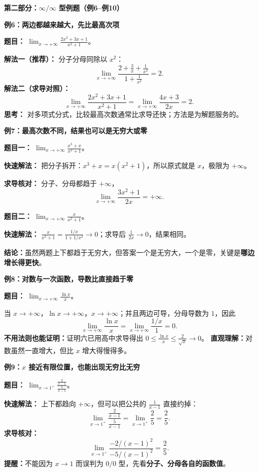 \clearpage
\begin{examplebox}
\textbf{\textcolor{CExample}{第二部分：$\infty/\infty$ 型例题（例6--例10）}}

\textbf{\textcolor{CExample}{例6：两边都越来越大，先比最高次项}}

\textbf{题目：} $\displaystyle\lim_{x\to+\infty}\frac{2x^2+3x+1}{x^2+1}$。

\textbf{解法一（推荐）：} 分子分母同除以 $x^2$：
\[
\lim_{x\to+\infty}\frac{2+\frac3x+\frac1{x^2}}{1+\frac1{x^2}}=\boxed{2}.
\]
\textbf{解法二（求导对照）：}
\[
\lim_{x\to+\infty}\frac{2x^2+3x+1}{x^2+1}
=\lim_{x\to+\infty}\frac{4x+3}{2x}
=2.
\]
\textbf{思考：} 对多项式分式，比较最高次数通常比求导还快；方法是为解题服务的。

\medskip

\medskip
\textbf{\textcolor{CExample}{例7：最高次数不同，结果也可以是无穷大或零}}

\textbf{题目一：} $\displaystyle\lim_{x\to+\infty}\frac{x^3+x}{x^2+1}$。

\textbf{快速解法：} 把分子拆开：$x^3+x=x(x^2+1)$，所以原式就是 $x$，极限为 $+\infty$。

\textbf{求导核对：} 分子、分母都趋于 $+\infty$，
\[
\lim_{x\to+\infty}\frac{3x^2+1}{2x}=+\infty.
\]

\textbf{题目二：} $\displaystyle\lim_{x\to+\infty}\frac{x}{x^2+1}$。

\textbf{快速解法：} $\frac{x}{x^2+1}=\frac{1/x}{1+1/x^2}\to0$；求导后 $\frac1{2x}\to0$，结果相同。

\textbf{结论：}虽然两题上下都趋于无穷大，但答案一个是无穷大，一个是零，关键是\textbf{哪边增长得更快}。

\medskip
\textbf{\textcolor{CExample}{例8：对数与一次函数，导数比直接趋于零}}

\textbf{题目：} $\displaystyle\lim_{x\to+\infty}\frac{\ln x}{x}$。

当 $x\to+\infty$，$\ln x\to+\infty$，$x\to+\infty$；并且两边可导，分母导数为 $1$，因此
\[
\lim_{x\to+\infty}\frac{\ln x}{x}
=\lim_{x\to+\infty}\frac{1/x}{1}=\boxed{0}.
\]
\textbf{不用法则也能证明：}证明六已用高中求导得出 $0\le\frac{\ln x}{x}\le\frac2{\sqrt{x}}\to0$。
\textbf{直观理解：}对数虽然一直增大，但比 $x$ 增大得慢得多。

\medskip
\textbf{\textcolor{CExample}{例9：$x$ 接近有限位置，也能出现无穷比无穷}}

\textbf{题目：} $\displaystyle\lim_{x\to1^+}\frac{\frac2{x-1}}{\frac5{x-1}}$。

\textbf{快速解法：} 上下都趋向 $+\infty$，但可以把公共的 $\frac1{x-1}$ 直接约掉：
\[
\lim_{x\to1^+}\frac{\frac2{x-1}}{\frac5{x-1}}
=\lim_{x\to1^+}\frac25=\boxed{\frac25}.
\]
\textbf{求导核对：}
\[
\lim_{x\to1^+}\frac{-2/(x-1)^2}{-5/(x-1)^2}
=\frac25.
\]
\textbf{提醒：}不能因为 $x\to1$ 而误判为 $0/0$ 型，先看\textbf{分子、分母各自的函数值}。


\end{examplebox}
